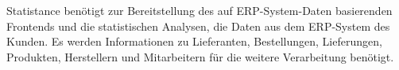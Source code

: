 Statistance benötigt zur Bereitstellung des auf ERP-System-Daten basierenden Frontends und die statistischen Analysen, die Daten aus dem ERP-System des Kunden. Es werden Informationen zu Lieferanten, Bestellungen, Lieferungen, Produkten, Herstellern und Mitarbeitern für die weitere Verarbeitung benötigt.